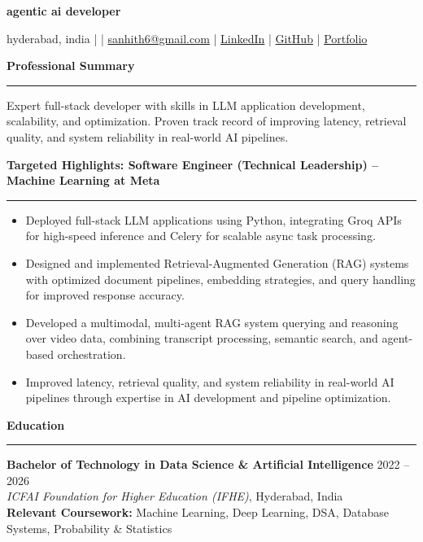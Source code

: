 \documentclass[9pt, letterpaper]{article}
\newcommand{\name}[1]{%
    \begin{center}
        {\LARGE \textbf{#1}}
    \end{center}
}
\newcommand{\sectionheading}[1]{%
    \vspace{4pt}%
    {\large \textbf{#1}}%
    \vspace{1pt}%
    \hrule
    \vspace{2pt}%
}
\begin{document}
\name{agentic ai developer}
\begin{center}
    hyderabad, india \quad |  \quad | \quad
    \href{mailto:sanhith6@gmail.com}{sanhith6@gmail.com} \quad | \quad
    \href{https://www.linkedin.com/in/sanhith-reddy-740a1625b/}{LinkedIn} \quad | \quad
    \href{https://github.com/tsanhith}{GitHub} \quad | \quad
    \href{https://johndoe.dev}{Portfolio}
\end{center}

\vspace{0pt}

\sectionheading{Professional Summary}
Expert full-stack developer with skills in LLM application development, scalability, and optimization. Proven track record of improving latency, retrieval quality, and system reliability in real-world AI pipelines.

\sectionheading{Targeted Highlights: Software Engineer (Technical Leadership) – Machine Learning at Meta}
\begin{itemize}[leftmargin=0.25in, itemindent=-0.15in, label={--}]
    \item Deployed full-stack LLM applications using Python, integrating Groq APIs for high-speed inference and Celery for scalable async task processing.
    \item Designed and implemented Retrieval-Augmented Generation (RAG) systems with optimized document pipelines, embedding strategies, and query handling for improved response accuracy.
    \item Developed a multimodal, multi-agent RAG system querying and reasoning over video data, combining transcript processing, semantic search, and agent-based orchestration.
    \item Improved latency, retrieval quality, and system reliability in real-world AI pipelines through expertise in AI development and pipeline optimization.
\end{itemize}

\sectionheading{Education}
\textbf{Bachelor of Technology in Data Science \& Artificial Intelligence} \hfill 2022 -- 2026 \\
\textit{ICFAI Foundation for Higher Education (IFHE)}, Hyderabad, India \\
\textbf{Relevant Coursework:} Machine Learning, Deep Learning, DSA, Database Systems, Probability \& Statistics
\end{document}
